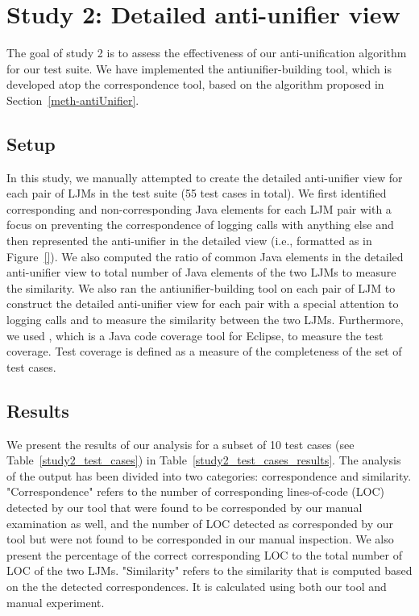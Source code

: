 \section{Study 2: Detailed anti-unifier view}  \label{study2}
The goal of study 2 is to assess the effectiveness of our anti-unification algorithm for our test suite. We have implemented the antiunifier-building tool, which is developed atop the correspondence tool, based on the algorithm proposed in Section~\ref{meth-antiUnifier}. 

\subsection{Setup}  \label{study2-setup}
In this study, we manually attempted to create the detailed anti-unifier view for each pair of LJMs in the test suite (55 test cases in total). We first identified corresponding and non-corresponding Java elements for each LJM pair with a focus on preventing the correspondence of logging calls with anything else and then represented the anti-unifier in the detailed view (i.e., formatted as in Figure~\ref{}). We also computed the ratio of common Java elements in the detailed anti-unifier view to total number of Java elements of the two LJMs to measure the similarity.  
We also ran the antiunifier-building tool on each pair of LJM to construct the detailed anti-unifier view for each pair with a special attention to logging calls and to measure the similarity between the two LJMs. Furthermore, we used , which is a Java code coverage tool for Eclipse, to measure the test coverage. Test coverage is defined as a measure of the completeness of the set of test cases. 



\subsection{Results}  \label{study2-results}
We present the results of our analysis for a subset of 10 test cases (see Table~\ref{study2_test_cases}) in Table~\ref{study2_test_cases_results}. The analysis of the output has been divided into two categories: correspondence and similarity. "Correspondence" refers to the number of corresponding lines-of-code (LOC) detected by our tool that were found to be corresponded by our manual examination as well, and the number of LOC detected as corresponded by our tool but were not found to be corresponded in our manual inspection. We also present the percentage of the correct corresponding LOC to the total number of LOC of the two LJMs. "Similarity" refers to the similarity that is computed based on the the detected correspondences. It is calculated using both our tool and manual experiment.


